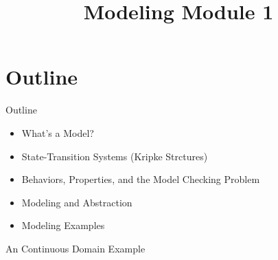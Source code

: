 \documentclass{beamer}
\title{Modeling Module 1}
\begin{document}
\begin{frame}
  \titlepage
\end{frame}


\section{Outline}


\begin{frame}{Outline}
\begin{itemize}
\item What's a Model?

\item State-Transition Systems (Kripke Strctures)

\item Behaviors, Properties, and the Model Checking Problem

\item Modeling and Abstraction

\item Modeling Examples
\end{itemize}
\end{frame}

\begin{frame}{An Continuous Domain Example}
\end{frame}
\end{document}
